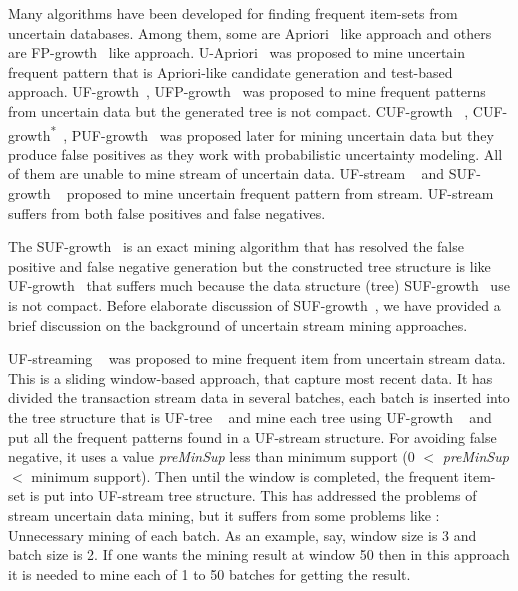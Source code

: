 \documentclass[conference]{IEEEtran}
\begin{document}
Many algorithms have been developed for finding frequent item-sets from uncertain databases. Among them, some are Apriori~\cite{DBLP:conf/vldb/AgrawalS94} like approach and others are FP-growth~\cite{DBLP:journals/datamine/HanPYM04} like approach. U-Apriori~\cite{DBLP:journals/tkde/ZhaoYN14} was proposed to mine uncertain frequent pattern that is Apriori-like candidate generation and test-based approach. UF-growth~\cite{DBLP:conf/kdd/GadeWK04}, UFP-growth~\cite{DBLP:conf/kdd/AggarwalLWW09} was proposed to mine frequent patterns from uncertain data but the generated tree is not compact. CUF-growth ~\cite{DBLP:conf/dasfaa/LeungT12}, CUF-growth\textsuperscript{*}~\cite{DBLP:conf/dasfaa/LeungT12}, PUF-growth~\cite{DBLP:conf/pakdd/LeungT13} was proposed later for mining uncertain data but they produce false positives as they work with probabilistic uncertainty modeling. All of them are unable to mine stream of uncertain data. UF-stream ~\cite{DBLP:conf/icde/LeungH09} and SUF-growth ~\cite{DBLP:conf/icde/LeungH09} proposed to mine uncertain frequent pattern from stream. UF-stream~\cite{DBLP:conf/icde/LeungH09} suffers from both false positives and false negatives. 

The SUF-growth~\cite{DBLP:conf/icde/LeungH09} is an exact mining algorithm that has resolved the false positive and false negative generation but the constructed tree structure is like UF-growth~\cite{DBLP:conf/kdd/GadeWK04} that suffers much because the data structure (tree) SUF-growth~\cite{DBLP:conf/icde/LeungH09} use is not compact. Before elaborate discussion of SUF-growth~\cite{DBLP:conf/icde/LeungH09}, we have provided a brief discussion on the background of uncertain stream mining approaches.

UF-streaming ~\cite{DBLP:conf/icde/LeungH09} was proposed to mine frequent item from uncertain stream data. This is a sliding window-based approach, that capture most recent data. It has divided the transaction stream data in several batches, each batch is inserted into the tree structure that is UF-tree ~\cite{DBLP:conf/kdd/GadeWK04} and mine each tree using UF-growth ~\cite{DBLP:conf/kdd/GadeWK04} and put all the frequent patterns found in a UF-stream structure. For avoiding false negative, it uses a value \emph{preMinSup} less than minimum support (0 $<$ \emph{preMinSup} $<$ minimum support). Then until the window is completed, the frequent item-set is put into UF-stream tree structure. This has addressed the problems of stream uncertain data mining, but it suffers from some problems like : Unnecessary mining of each batch. As an example, say, window size is 3 and batch size is 2. If one wants the mining result at window 50 then in this approach it is needed to mine each of 1 to 50 batches for getting the result.
\end{document}
